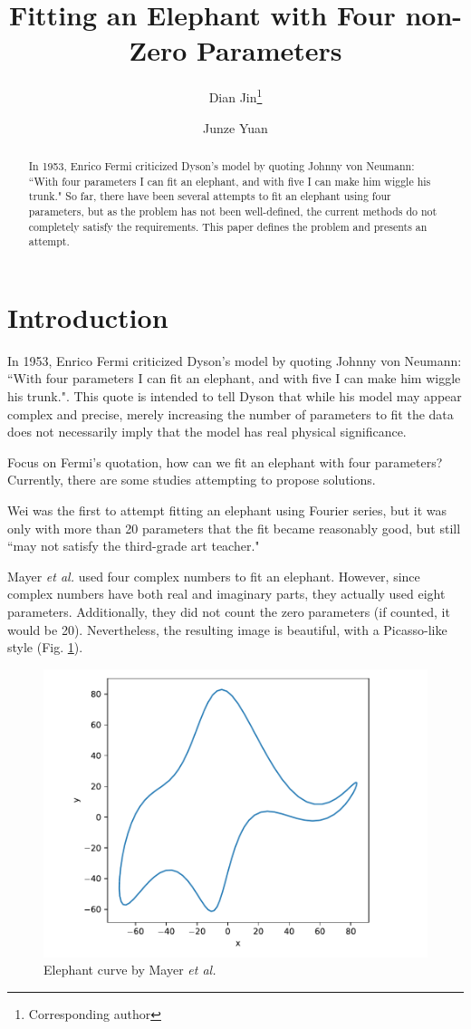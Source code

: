 \documentclass{article}
\title{Fitting an Elephant with Four non-Zero Parameters}
\author[1]{Dian Jin\thanks{Corresponding author} }
\author[2]{Junze Yuan}
\affil[1]{\textit{Research Institute for Intelligent Wearable Systems, The Hong Kong Polytechinic University}}
\affil[2]{\textit{Faculty of Engineering and Natural Sciences, ATME, Tampere University}}
\date{}
\begin{document}
	
\maketitle

\begin{abstract}
	In 1953, Enrico Fermi criticized Dyson’s model by quoting Johnny von Neumann: ``With four parameters I can fit an elephant, and with five I can make him wiggle his trunk." So far, there have been several attempts to fit an elephant using four parameters, but as the problem has not been well-defined, the current methods do not completely satisfy the requirements. This paper defines the problem and presents an attempt.
\end{abstract}

\section{Introduction}
In 1953, Enrico Fermi criticized Dyson’s model by quoting Johnny von Neumann: ``With four parameters I can fit an elephant, and with five I can make him wiggle his trunk."\cite{dyson2004meeting}.
This quote is intended to tell Dyson that while his model may appear complex and precise, merely increasing the number of parameters to fit the data does not necessarily imply that the model has real physical significance. 

Focus on Fermi's quotation, how can we fit an elephant with four parameters? Currently, there are some studies attempting to propose solutions.

Wei \cite{wei1975least} was the first to attempt fitting an elephant using Fourier series, but it was only with more than 20 parameters that the fit became reasonably good, but still ``may not satisfy the third-grade art teacher."

Mayer \textit{et al.} \cite{mayerDrawingElephantFour2010} used four complex numbers to fit an elephant. However, since complex numbers have both real and imaginary parts, they actually used eight parameters. Additionally, they did not count the zero parameters (if counted, it would be 20). Nevertheless, the resulting image is beautiful, with a Picasso-like style (Fig. \ref{fig:elephant2010}).




\begin{figure}[h]
	\centering
	\includegraphics[width=0.6\linewidth]{elephant2010}
	\caption{Elephant curve by Mayer \textit{et al.}}
	\label{fig:elephant2010}
\end{figure}
\end{document}
